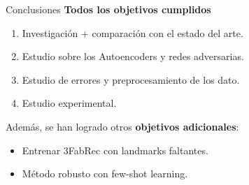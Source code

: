 \documentclass[aspectratio=43]{beamer}
\begin{document}
\begin{frame}[t]{Conclusiones}
  \normalsize \textbf{Todos los objetivos cumplidos}
  \begin{enumerate}
    \item \small Investigación + comparación con el estado del arte.
    \item \small Estudio sobre los Autoencoders y redes adversarias.
    \item \small Estudio de errores y preprocesamiento de los dato.
    \item \small Estudio experimental.
  \end{enumerate}
  
  \medskip

  \normalsize Además, se han logrado otros \textbf{objetivos adicionales}:
  \begin{itemize}
    \item \small Entrenar 3FabRec con landmarks faltantes.
    \item \small Método robusto con few-shot learning.
  \end{itemize}
\end{frame}
\end{document}
